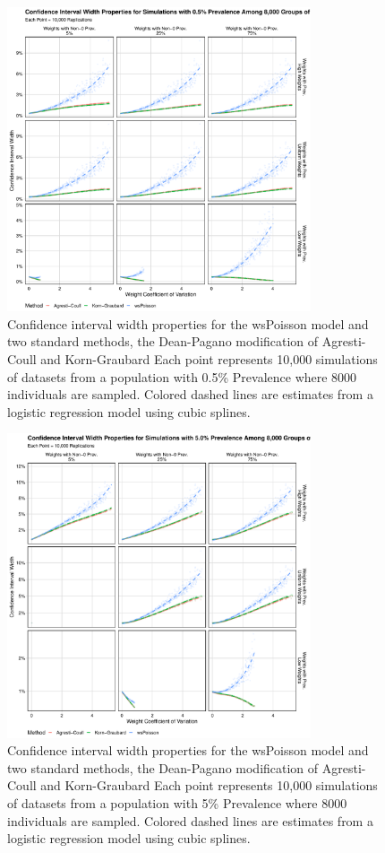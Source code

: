 \documentclass[AMA,STIX1COL]{WileyNJD-v2}
\begin{document}
\begin{figure}
\centering
\includegraphics[width=0.8\textwidth]{figures/perfect_confidence_interval_width_8000_groups_0_005_prev}
\caption{Confidence interval width properties for the wsPoisson model and two standard methods, the Dean-Pagano modification of Agresti-Coull and Korn-Graubard
Each point represents 10,000 simulations of datasets from a population with 0.5\% Prevalence where 8000 individuals are sampled.
Colored dashed lines are estimates from a logistic regression model using cubic splines.}
\label{fig:perfect_confidence_interval_width_8000_groups_0_005_prev}
\end{figure}


\begin{figure}
\centering
\includegraphics[width=0.8\textwidth]{figures/perfect_confidence_interval_width_8000_groups_0_05_prev}
\caption{Confidence interval width properties for the wsPoisson model and two standard methods, the Dean-Pagano modification of Agresti-Coull and Korn-Graubard
Each point represents 10,000 simulations of datasets from a population with 5\% Prevalence where 8000 individuals are sampled.
Colored dashed lines are estimates from a logistic regression model using cubic splines.}
\label{fig:perfect_confidence_interval_width_8000_groups_0_05_prev}
\end{figure}
\end{document}
